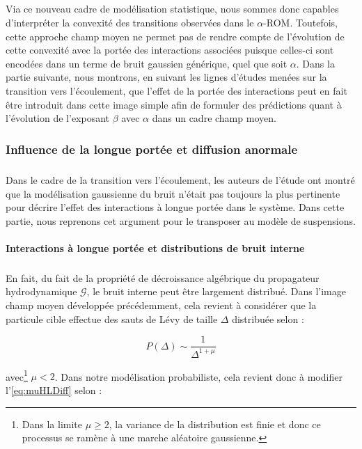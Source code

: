\subparagraph{}Via ce nouveau cadre de modélisation statistique, nous sommes donc capables d'interpréter la convexité des transitions observées dans le $\alpha$-ROM. Toutefois, cette approche champ moyen ne permet pas de rendre compte de l'évolution de cette convexité avec la portée des interactions associées puisque celles-ci sont encodées dans un terme de bruit gaussien générique, quel que soit $\alpha$. Dans la partie suivante, nous montrons, en suivant les lignes d'études menées sur la transition vers l'écoulement, que l'effet de la portée des interactions peut en fait être introduit dans cette image simple afin de formuler des prédictions quant à l'évolution de l'exposant $\beta$ avec $\alpha$ dans un cadre champ moyen.
 
\subsubsection{Influence de la longue portée et diffusion anormale}

\label{sec:LPHL}

\subparagraph{}Dans le cadre de la transition vers l'écoulement, les auteurs de l'étude \cite{lin_mean-field_2016} ont montré que la modélisation gaussienne du bruit n'était pas toujours la plus pertinente pour décrire l'effet des interactions à longue portée dans le système. Dans cette partie, nous reprenons cet argument pour le transposer au modèle de suspensions.

\paragraph{Interactions à longue portée et distributions de bruit interne}

\subparagraph{}En fait, du fait de la propriété de décroissance algébrique du propagateur hydrodynamique $ \mathcal{G}$, le bruit interne peut être largement distribué. Dans l'image champ moyen développée précédemment, cela revient à considérer que la particule cible effectue des sauts de Lévy de taille $\Delta$ distribuée selon :

\begin{equation}
	P(\Delta) \sim \frac{1}{\Delta^{1+\mu}}
\end{equation}

\noindent avec\footnote{Dans la limite $\mu \geq 2$, la variance de la distribution est finie et donc ce processus se ramène à une marche aléatoire gaussienne.} $\mu < 2$. Dans notre modélisation probabiliste, cela revient donc à modifier l'\autoref{eq:muHLDiff} selon :

